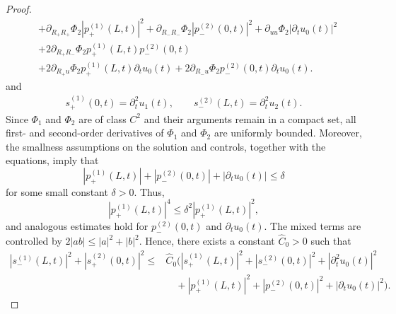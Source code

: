 \documentclass[12pt]{article}
\numberwithin{equation}{section}
\begin{document}
\begin{proof}
\begin{align}
&+
\partial_{R_+R_+}\Phi_2
\left|p_+^{(1)}(L,t)\right|^2
+
\partial_{R_-R_-}\Phi_2
\left|p_-^{(2)}(0,t)\right|^2
+
\partial_{uu}\Phi_2
\left|\partial_tu_0(t)\right|^2
\nonumber\\
&+
2\partial_{R_+R_-}\Phi_2
p_+^{(1)}(L,t)p_-^{(2)}(0,t)
\nonumber\\
&+
2\partial_{R_+u}\Phi_2
p_+^{(1)}(L,t)\partial_tu_0(t)
+
2\partial_{R_-u}\Phi_2
p_-^{(2)}(0,t)\partial_tu_0(t).
\label{eq-s2}
\end{align}
and
\begin{align}
    s_+^{(1)}(0,t)=\partial_t^2u_1(t),\qquad
    s_-^{(2)}(L,t)=\partial_t^2u_2(t).
\end{align}
Since $\Phi_1$ and $\Phi_2$ are of class $C^2$ and their
arguments remain in a compact set, all first- and second-order
derivatives of $\Phi_1$ and $\Phi_2$ are uniformly bounded.
Moreover, the smallness assumptions on the solution and controls,
together with the equations, imply that
\[
|p_+^{(1)}(L,t)|
+|p_-^{(2)}(0,t)|
+|\partial_tu_0(t)|
\leq \delta
\]
for some small constant $\delta>0$. Thus,
\[
|p_+^{(1)}(L,t)|^4
\leq
\delta^2|p_+^{(1)}(L,t)|^2,
\]
and analogous estimates hold for
$p_-^{(2)}(0,t)$ and $\partial_tu_0(t)$. The mixed terms are
controlled by $2|ab|\leq |a|^2+|b|^2$. Hence, there exists a constant $\widehat C_0>0$  such that
\begin{align}
|s_-^{(1)}(L,t)|^2+|s_+^{(2)}(0,t)|^2
\leq{}&
\widehat C_0\Big(
|s_+^{(1)}(L,t)|^2
+|s_-^{(2)}(0,t)|^2
+|\partial_t^2u_0(t)|^2
\nonumber\\
&\quad
+|p_+^{(1)}(L,t)|^2
+|p_-^{(2)}(0,t)|^2
+|\partial_tu_0(t)|^2
\Big).
\label{I_s-eq2}

\end{align}
\end{proof}
\end{document}
